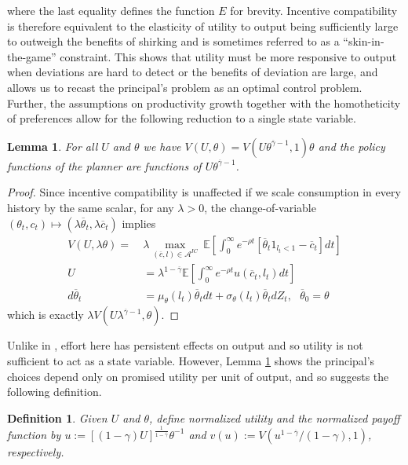 \documentclass[11pt]{article}
\theoremstyle{plain}
\newtheorem{lemma}[thm]{Lemma}
\newtheorem{defn}{Definition}[section]
\begin{document}
where the last equality defines the function $E$ for brevity. Incentive compatibility is therefore equivalent to the elasticity of utility to output being sufficiently large to outweigh the benefits of shirking and is sometimes referred to as a ``skin-in-the-game'' constraint. This shows that utility must be more responsive to output when deviations are hard to detect or the benefits of deviation are large, and allows us to recast the principal's problem as an optimal control problem. Further, the assumptions on productivity growth together with the homotheticity of preferences allow for the following reduction to a single state variable. 

\begin{lemma}\label{homogprod}
For all $U$ and $\theta$ we have $V(U,\theta) = V(U\theta^{\overline{\gamma}-1},1) \theta$ and the policy functions of the planner are functions of $U\theta^{\overline{\gamma}-1}$. 
\end{lemma} 
\begin{proof}
Since incentive compatibility is unaffected if we scale consumption in every history by the same scalar, for any $\lambda >0$, the change-of-variable $(\theta_t,c_t) \mapsto (\lambda \overline{\theta}_t,\lambda \overline{c}_t)$ implies 
\begin{align*}
V(U, \lambda \theta) = \ &\lambda \max_{(\overline{c},l) \in \mathcal{A}^{IC}} \ \mathbb{E}{\left[\int_{0}^{\infty}e^{-\rho t}[\overline{\theta}_t1_{l_t<1} - \overline{c}_t] dt\right]}
\\ U & = \lambda^{1-\overline{\gamma}} \mathbb{E}{\left[\int_{0}^{\infty}e^{-\rho t}u(\overline{c}_t,l_t)dt\right]}
\\ d\overline{\theta}_t & =  \mu_{\theta}(l_t) \overline{\theta}_tdt + \sigma_{\theta}(l_t) \overline{\theta}_t dZ_t, \ \ \ \overline{\theta}_0 = \theta
\end{align*}
which is exactly $\lambda V(U\lambda^{\overline{\gamma}-1}, \theta)$.
\end{proof}
\noindent Unlike in \cite{sannikov_continuous-time_2008}, effort here has persistent effects on output and so utility is not sufficient to act as a state variable. However, Lemma \ref{homogprod} shows the principal's choices depend only on promised utility per unit of output, and so suggests the following definition. 
\begin{defn} 
Given $U$ and $\theta$, define normalized utility and the normalized payoff function by $u := [(1-\gamma)U]^{\frac{1}{1-\overline{\gamma}}}\theta^{-1}$ and $v(u) := V{\left(u^{1-\overline{\gamma}}/(1-\gamma),1\right)}$, respectively. 
\end{defn}
\end{document}
